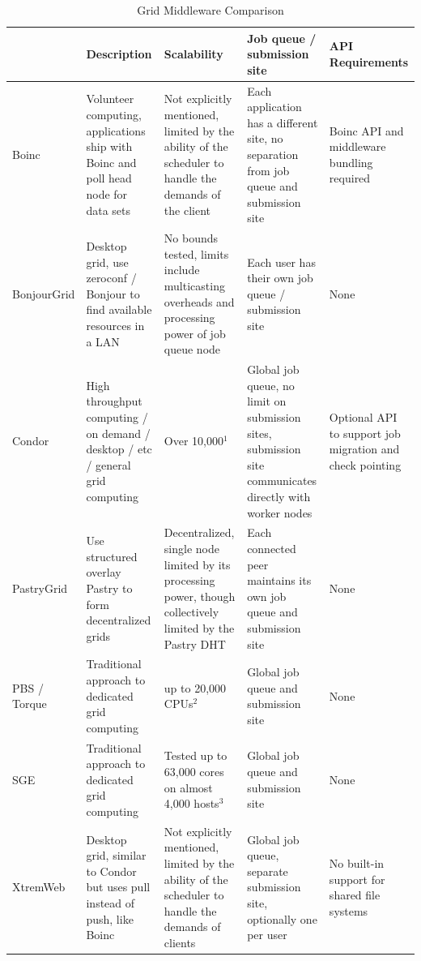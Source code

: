 \begin{center}
\begin{table}
\caption{Grid Middleware Comparison}
\footnotesize{
\begin{tabular}[c]{p{1.6cm}p{3.25cm}p{3.4cm}p{3.2cm}p{3.05cm}} \hline
& Description & Scalability & Job queue / submission site & API Requirements \\ \hline
Boinc &
Volunteer computing, applications ship with Boinc and poll head node for data
sets &
Not explicitly mentioned, limited by the ability of the scheduler to handle
the demands of the client &
Each application has a different site, no separation from job queue and
submission site &
Boinc API and middleware bundling required
\\
BonjourGrid &
Desktop grid, use zeroconf / Bonjour to find available resources in a LAN &
No bounds tested, limits include multicasting overheads and processing power
of job queue node &
Each user has their own job queue / submission site &
None \\
Condor &
High throughput computing / on demand / desktop / etc / general grid computing &
Over 10,000$^{1}$ &
Global job queue, no limit on submission sites, submission site communicates directly with worker nodes &
Optional API to support job migration and check pointing \\
PastryGrid &
Use structured overlay Pastry to form decentralized grids &
Decentralized, single node limited by its processing power, though
collectively limited by the Pastry DHT &
Each connected peer maintains its own job queue and submission site &
None \\
PBS / Torque~\cite{torque} &
Traditional approach to dedicated grid computing &
up to 20,000 CPUs$^{2}$ &
Global job queue and submission site &
None
\\
SGE &
Traditional approach to dedicated grid computing &
Tested up to 63,000 cores on almost 4,000 hosts$^{3}$ &
Global job queue and submission site &
None
\\
XtremWeb &
Desktop grid, similar to Condor but uses pull instead of push, like Boinc &
Not explicitly mentioned, limited by the ability of the scheduler to handle
the demands of clients &
Global job queue, separate submission site, optionally one per user &
No built-in support for shared file systems
\\ \hline
\end{tabular}
}
\label{tab:grid}
\end{table}
\end{center}

